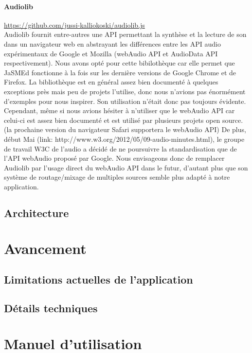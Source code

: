 \documentclass[pdftex,12pt,a4paper]{article}
\begin{document}
\paragraph{Audiolib}\url{https://github.com/jussi-kalliokoski/audiolib.js}\\
Audiolib fournit entre-autres une API permettant la synthèse et la lecture de son dans un navigateur web en abstrayant les différences entre les API audio expérimentaux de Google et Mozilla (webAudio API et AudioData API respectivement).
Nous avons opté pour cette bibilothèque car elle permet que JaSMEd fonctionne à la fois sur les dernière versions de Google Chrome et de Firefox.
La bibliothèque est en général assez bien documenté à quelques exceptions près mais peu de projets l’utilise, donc nous n’avions pas énormément d’exemples pour nous inspirer. Son utilisation n’était donc pas toujours évidente.
Cependant, même si  nous avions hésiter à n’utiliser que le webAudio API car celui-ci est assez bien documenté et est utilisé par plusieurs projets open source. (la prochaine version du navigateur Safari supportera le webAudio API)
De plus, début Mai (link: http://www.w3.org/2012/05/09-audio-minutes.html), le groupe de travail W3C de l’audio a décidé de ne poursuivre la standardisation que de l’API webAudio proposé par Google. Nous envisageons donc de remplacer Audiolib par l’usage direct du webAudio API dans le futur, d’autant plus que son système de routage/mixage de multiples sources semble plus adapté à notre application.

\subsection{Architecture}


\section{Avancement}

\subsection{Limitations actuelles de l’application}

\subsection{Détails techniques}


\section{Manuel d'utilisation}
\end{document}
